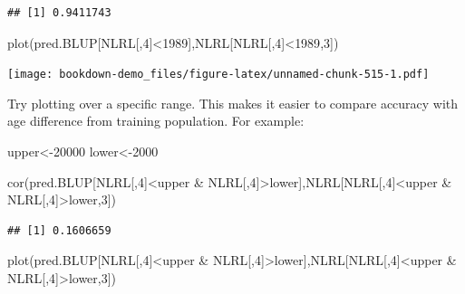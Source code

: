 \documentclass[
]{book}
\newenvironment{Shaded}{\begin{snugshade}}{\end{snugshade}}
\newcommand{\DecValTok}[1]{\textcolor[rgb]{0.00,0.00,0.81}{#1}}
\newcommand{\FunctionTok}[1]{\textcolor[rgb]{0.00,0.00,0.00}{#1}}
\newcommand{\NormalTok}[1]{#1}
\newcommand{\OtherTok}[1]{\textcolor[rgb]{0.56,0.35,0.01}{#1}}
\newcommand{\SpecialCharTok}[1]{\textcolor[rgb]{0.00,0.00,0.00}{#1}}
\begin{document}
\begin{verbatim}
## [1] 0.9411743
\end{verbatim}

\begin{Shaded}
\begin{Highlighting}[]
\FunctionTok{plot}\NormalTok{(pred.BLUP[NLRL[,}\DecValTok{4}\NormalTok{]}\SpecialCharTok{\textless{}}\DecValTok{1989}\NormalTok{],NLRL[NLRL[,}\DecValTok{4}\NormalTok{]}\SpecialCharTok{\textless{}}\DecValTok{1989}\NormalTok{,}\DecValTok{3}\NormalTok{])}
\end{Highlighting}
\end{Shaded}

\texttt{[image: bookdown-demo\_files/figure-latex/unnamed-chunk-515-1.pdf]}

Try plotting over a specific range. This makes it easier to compare accuracy with age
difference from training population. For example:

\begin{Shaded}
\begin{Highlighting}[]
\NormalTok{upper}\OtherTok{\textless{}{-}}\DecValTok{20000}
\NormalTok{lower}\OtherTok{\textless{}{-}}\DecValTok{2000}

\FunctionTok{cor}\NormalTok{(pred.BLUP[NLRL[,}\DecValTok{4}\NormalTok{]}\SpecialCharTok{\textless{}}\NormalTok{upper }\SpecialCharTok{\&}\NormalTok{ NLRL[,}\DecValTok{4}\NormalTok{]}\SpecialCharTok{\textgreater{}}\NormalTok{lower],NLRL[NLRL[,}\DecValTok{4}\NormalTok{]}\SpecialCharTok{\textless{}}\NormalTok{upper }\SpecialCharTok{\&}
\NormalTok{NLRL[,}\DecValTok{4}\NormalTok{]}\SpecialCharTok{\textgreater{}}\NormalTok{lower,}\DecValTok{3}\NormalTok{])}
\end{Highlighting}
\end{Shaded}

\begin{verbatim}
## [1] 0.1606659
\end{verbatim}

\begin{Shaded}
\begin{Highlighting}[]
\FunctionTok{plot}\NormalTok{(pred.BLUP[NLRL[,}\DecValTok{4}\NormalTok{]}\SpecialCharTok{\textless{}}\NormalTok{upper }\SpecialCharTok{\&}\NormalTok{ NLRL[,}\DecValTok{4}\NormalTok{]}\SpecialCharTok{\textgreater{}}\NormalTok{lower],NLRL[NLRL[,}\DecValTok{4}\NormalTok{]}\SpecialCharTok{\textless{}}\NormalTok{upper }\SpecialCharTok{\&}
\NormalTok{NLRL[,}\DecValTok{4}\NormalTok{]}\SpecialCharTok{\textgreater{}}\NormalTok{lower,}\DecValTok{3}\NormalTok{])}
\end{Highlighting}
\end{Shaded}
\end{document}

